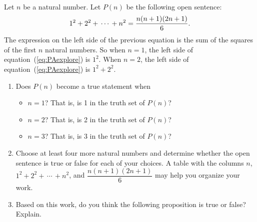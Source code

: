 \begin{previewactivity} \label{PA:exploresum} \hfill \\
\setcounter{equation}{0}
Let  $n$  be a natural number.  Let $P( n )$ be the following open sentence:
\begin{equation} \label{eq:PAexplore} \notag
1^2  + 2^2  + \, \cdots \, + n^2  = \frac{{n(n + 1)(2n + 1)}}{6}.
\end{equation}
The expression on the left side of the previous equation is the sum of the squares of the first  $n$  natural numbers.  So when  $n = 1$, the left side of equation~(\ref{eq:PAexplore}) is  
$1^2 $.  When  $n = 2$, the left side of equation~(\ref{eq:PAexplore}) is  $1^2  + 2^2 $.

\begin{enumerate}
\item Does $P ( n )$ become a true statement when
\begin{itemize}
\item  $n = 1$?  That is, is  1  in the truth set of $P ( n )$?

\item $n = 2$?  That is, is  2  in the truth set of $P ( n )$?

\item $n = 3$?  That is, is  3  in the truth set of $P ( n )$?
\end{itemize}

\item Choose at least four more natural numbers and determine whether the open sentence is true or false for each of your choices.  A table with the columns $n$, $1^2  + 2^2  + \, \cdots \, + n^2$, and $\dfrac{{n(n + 1)(2n + 1)}}{6}$ may help you organize your work.

\item Based on this work, do you think the following proposition is true or false?  Explain.

\end{enumerate}
\end{previewactivity}
\hbreak
%

